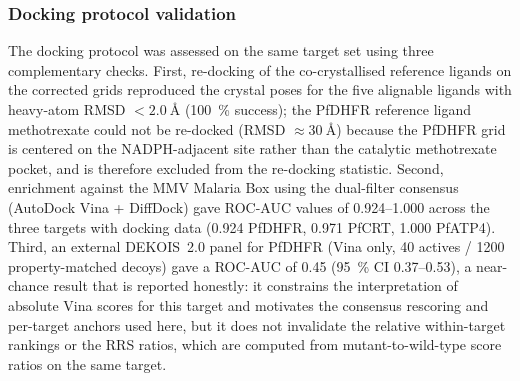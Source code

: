 \documentclass[journal=jcisd8,manuscript=article]{achemso}
\begin{document}
\subsubsection{Docking protocol validation}
The docking protocol was assessed on the same target set using three complementary checks. First, re-docking of the co-crystallised reference ligands on the corrected grids reproduced the crystal poses for the five alignable ligands with heavy-atom RMSD $< \SI{2.0}{\angstrom}$ (\qty{100}{\percent} success); the PfDHFR reference ligand methotrexate could not be re-docked (RMSD $\approx \SI{30}{\angstrom}$) because the PfDHFR grid is centered on the NADPH-adjacent site rather than the catalytic methotrexate pocket, and is therefore excluded from the re-docking statistic. Second, enrichment against the MMV Malaria Box using the dual-filter consensus (AutoDock Vina + DiffDock) gave ROC-AUC values of \numrange{0.924}{1.000} across the three targets with docking data (\num{0.924} PfDHFR, \num{0.971} PfCRT, \num{1.000} PfATP4). Third, an external DEKOIS~2.0 panel for PfDHFR (Vina only, \num{40} actives / \num{1200} property-matched decoys) gave a ROC-AUC of \num{0.45} (\qty{95}{\percent} CI \numrange{0.37}{0.53}), a near-chance result that is reported honestly: it constrains the interpretation of absolute Vina scores for this target and motivates the consensus rescoring and per-target anchors used here, but it does not invalidate the relative within-target rankings or the RRS ratios, which are computed from mutant-to-wild-type score ratios on the same target.
\end{document}
